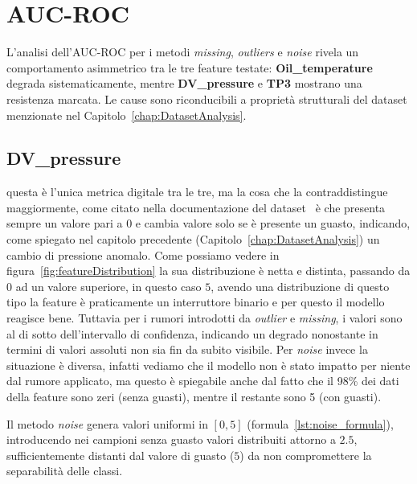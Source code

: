 \documentclass[../main.tex]{subfiles}
\begin{document}
\section{AUC-ROC}
L'analisi dell'AUC-ROC per i metodi \textit{missing}, \textit{outliers} e \textit{noise} rivela un comportamento asimmetrico tra le tre feature testate: \textbf{Oil\_temperature} degrada sistematicamente, mentre \textbf{DV\_pressure} e \textbf{TP3} mostrano una resistenza marcata. Le cause sono riconducibili a proprietà strutturali del dataset menzionate nel Capitolo~\ref{chap:DatasetAnalysis}.


\subsection{DV\_pressure} questa è l'unica metrica digitale tra le tre, ma la cosa che la contraddistingue maggiormente, come citato nella documentazione del dataset~\cite{MetroDT} è che presenta sempre un valore pari a $0$ e cambia valore solo se è presente un guasto, indicando, come spiegato nel capitolo precedente (Capitolo~\ref{chap:DatasetAnalysis}) un cambio di pressione anomalo. Come possiamo vedere in figura~\ref{fig:featureDistribution} la sua distribuzione è netta e distinta, passando da $0$ ad un valore superiore, in questo caso $5$, avendo una distribuzione di questo tipo la feature è praticamente un interruttore binario e per questo il modello reagisce bene. Tuttavia per i rumori introdotti da \textit{outlier} e \textit{missing}, i valori sono al di sotto dell'intervallo di confidenza, indicando un degrado nonostante in termini di valori assoluti non sia fin da subito visibile. Per \textit{noise} invece la situazione è diversa, infatti vediamo che il modello non è stato impatto per niente dal rumore applicato, ma questo è spiegabile anche dal fatto che il 98\% dei dati della feature sono zeri (senza guasti), mentre il restante sono 5 (con guasti). 

Il metodo \textit{noise} genera valori uniformi in $[0, 5]$ (formula~\ref{lst:noise_formula}), introducendo nei campioni senza guasto valori distribuiti attorno a $2.5$, sufficientemente distanti dal valore di guasto ($5$) da non compromettere la separabilità delle classi.
\end{document}
